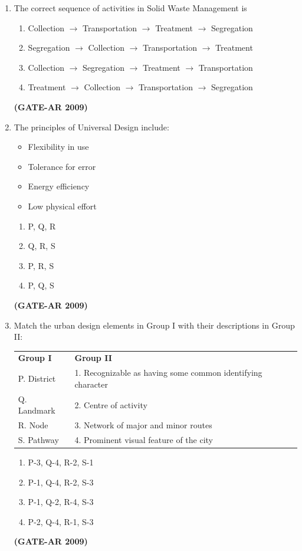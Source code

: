 \documentclass[a4paper,10pt]{article}
\begin{document}
\begin{enumerate}
	\item The correct sequence of activities in Solid Waste Management is 
    \begin{enumerate}
        \item Collection $\to$ Transportation $\to$ Treatment $\to$ Segregation
        \item Segregation $\to$ Collection $\to$ Transportation $\to$ Treatment
        \item Collection $\to$ Segregation $\to$ Treatment $\to$ Transportation
        \item Treatment $\to$ Collection $\to$ Transportation $\to$ Segregation
    \end{enumerate}
    \hfill \textbf{(GATE-AR 2009)}
    
    \item The principles of Universal Design include: 
    \begin{itemize}
        \item Flexibility in use
        \item Tolerance for error
        \item Energy efficiency
        \item Low physical effort
    \end{itemize}
    \begin{multicols}{4}
	\begin{enumerate}
        \item P, Q, R
        \item Q, R, S
        \item P, R, S
        \item P, Q, S
    \end{enumerate}
	\end{multicols}
    \hfill \textbf{(GATE-AR 2009)}
    
    \item Match the urban design elements in Group I with their descriptions in Group II:  \\
    \begin{tabular}{ l l }
	\textbf{Group I} & \textbf{Group II} \\
	P. District & 1. Recognizable as having some common identifying character \\
	Q. Landmark & 2. Centre of activity \\
	R. Node & 3. Network of major and minor routes \\
	S. Pathway & 4. Prominent visual feature of the city \\
	\end{tabular}
	\begin{multicols}{2}
	\begin{enumerate}
        \item P-3, Q-4, R-2, S-1
        \item P-1, Q-4, R-2, S-3
        \item P-1, Q-2, R-4, S-3
        \item P-2, Q-4, R-1, S-3
    \end{enumerate}
	\end{multicols}
    \hfill \textbf{(GATE-AR 2009)}


\end{enumerate}
\end{document}
